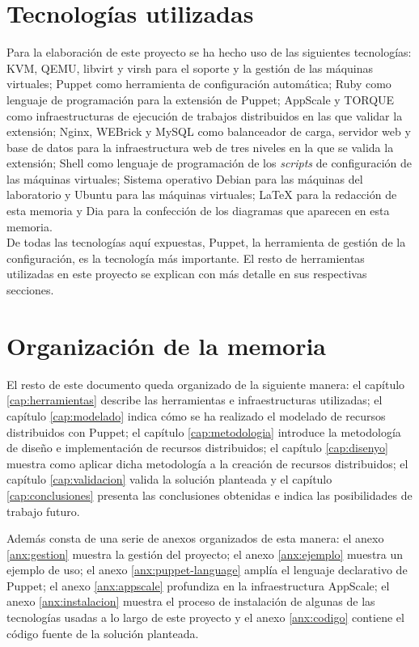 \section{Tecnologías utilizadas}


Para la elaboración de este proyecto se ha hecho uso de las siguientes tecnologías: KVM, QEMU, libvirt y virsh para el soporte y la gestión de las máquinas virtuales; Puppet como herramienta de configuración automática; Ruby como lenguaje de programación para la extensión de Puppet; AppScale y TORQUE como infraestructuras de ejecución de trabajos distribuidos en las que validar la extensión; Nginx, WEBrick y MySQL como balanceador de carga, servidor web y base de datos para la infraestructura web de tres niveles en la que se valida la extensión; Shell como lenguaje de programación de los \emph{scripts} de configuración de las máquinas virtuales; Sistema operativo Debian para las máquinas del laboratorio y Ubuntu para las máquinas virtuales; \LaTeX{} \cite{manual:latex} para la redacción de esta memoria y Dia para la confección de los diagramas que aparecen en esta memoria. \\

De todas las tecnologías aquí expuestas, Puppet, la herramienta de gestión de la configuración, es la tecnología más importante. El resto de herramientas utilizadas en este proyecto se explican con más detalle en sus respectivas secciones.


\section{Organización de la memoria}


El resto de este documento queda organizado de la siguiente manera: el capítulo \ref{cap:herramientas} describe las herramientas e infraestructuras utilizadas; el capítulo \ref{cap:modelado} indica cómo se ha realizado el modelado de recursos distribuidos con Puppet; el capítulo \ref{cap:metodologia} introduce la metodología de diseño e implementación de recursos distribuidos; el capítulo \ref{cap:disenyo} muestra como aplicar dicha metodología a la creación de recursos distribuidos; el capítulo \ref{cap:validacion} valida la solución planteada y el capítulo \ref{cap:conclusiones} presenta las conclusiones obtenidas e indica las posibilidades de trabajo futuro.

Además consta de una serie de anexos organizados de esta manera: el anexo \ref{anx:gestion} muestra la gestión del proyecto; el anexo \ref{anx:ejemplo} muestra un ejemplo de uso; el anexo \ref{anx:puppet-language} amplía el lenguaje declarativo de Puppet; el anexo \ref{anx:appscale} profundiza en la infraestructura AppScale; el anexo \ref{anx:instalacion} muestra el proceso de instalación de algunas de las tecnologías usadas a lo largo de este proyecto y el anexo \ref{anx:codigo} contiene el código fuente de la solución planteada.


